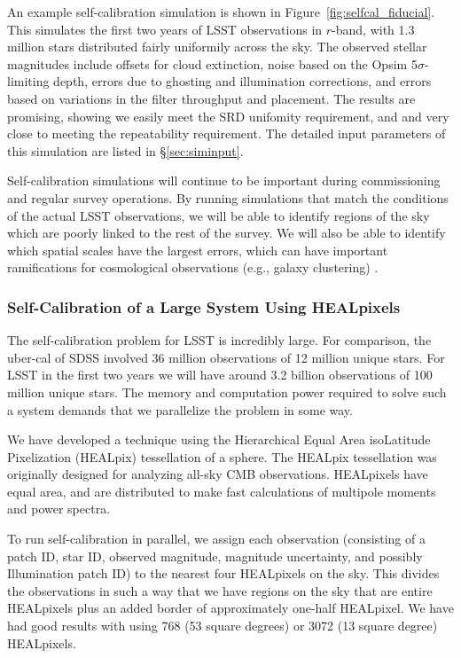 \documentclass[12pt,preprint]{aastex}
\begin{document}
An example self-calibration simulation is shown in Figure~\ref{fig:selfcal_fiducial}.  This simulates the first two years of LSST observations in $r$-band, with 1.3 million stars distributed fairly uniformily across the sky.  The observed stellar magnitudes include offsets for cloud extinction, noise based on the Opsim 5$\sigma$-limiting depth, errors due to ghosting and illumination corrections, and errors based on variations in the filter throughput and placement.  The results are promising, showing we easily meet the SRD unifomity requirement, and and very close to meeting the repeatability requirement.  The detailed input parameters of this simulation are listed in \S\ref{sec:siminput}.

Self-calibration simulations will continue to be important during commissioning and regular survey operations.  By running simulations that match the conditions of the actual LSST observations, we will be able to identify regions of the sky which are poorly linked to the rest of the survey.  We will also be able to identify which spatial scales have the largest errors, which can have important ramifications for cosmological observations (e.g., galaxy clustering) \citep{Huterer13}. 







\subsubsection{Self-Calibration of a Large System Using HEALpixels}

The self-calibration problem for LSST is incredibly large.  For comparison, the uber-cal of SDSS involved 36 million observations of 12 million unique stars.  For LSST in the first two years we will have around 3.2 billion observations of 100 million unique stars.  The memory and computation power required to solve such a system demands that we parallelize the problem in some way.

We have developed a technique using the Hierarchical Equal Area isoLatitude Pixelization (HEALpix) tessellation of a sphere.  The HEALpix tessellation was originally designed for analyzing all-sky CMB observations.  HEALpixels have equal area, and are distributed to make fast calculations of multipole moments and power spectra.  

To run self-calibration in parallel, we assign each observation (consisting of a patch ID, star ID, observed magnitude, magnitude uncertainty, and possibly Illumination patch ID) to the nearest four HEALpixels on the sky.  This divides the observations in such a way that we have regions on the sky that are entire HEALpixels plus an added border of approximately one-half HEALpixel.  We have had good results with using 768 (53 square degrees) or 3072 (13 square degree) HEALpixels.  
\end{document}
